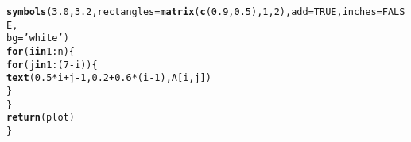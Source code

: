\documentclass[12pt]{article}\usepackage[]{graphicx}\usepackage[]{color}
\makeatletter
\newcommand{\hlnum}[1]{\textcolor[rgb]{0.686,0.059,0.569}{#1}}%
\newcommand{\hlstr}[1]{\textcolor[rgb]{0.192,0.494,0.8}{#1}}%
\newcommand{\hlopt}[1]{\textcolor[rgb]{0,0,0}{#1}}%
\newcommand{\hlstd}[1]{\textcolor[rgb]{0.345,0.345,0.345}{#1}}%
\newcommand{\hlkwa}[1]{\textcolor[rgb]{0.161,0.373,0.58}{\textbf{#1}}}%
\newcommand{\hlkwc}[1]{\textcolor[rgb]{0.333,0.667,0.333}{#1}}%
\newcommand{\hlkwd}[1]{\textcolor[rgb]{0.737,0.353,0.396}{\textbf{#1}}}%
\newenvironment{kframe}{%
 \def\at@end@of@kframe{}%
 \ifinner\ifhmode%
  \def\at@end@of@kframe{\end{minipage}}%
  \begin{minipage}{\columnwidth}%
 \fi\fi%
 \def\FrameCommand##1{\hskip\@totalleftmargin \hskip-\fboxsep
 \colorbox{shadecolor}{##1}\hskip-\fboxsep
     \hskip-\linewidth \hskip-\@totalleftmargin \hskip\columnwidth}%
 \MakeFramed {\advance\hsize-\width
   \@totalleftmargin\z@ \linewidth\hsize
   \@setminipage}}%
 {\par\unskip\endMakeFramed%
 \at@end@of@kframe}
\newenvironment{knitrout}{}{} %
\makeatother
\begin{document}
\begin{knitrout}
\begin{kframe}
\begin{alltt}
  \hlkwd{symbols}\hlstd{(}\hlnum{3.0}\hlstd{,} \hlnum{3.2}\hlstd{,} \hlkwc{rectangles} \hlstd{=} \hlkwd{matrix}\hlstd{(}\hlkwd{c}\hlstd{(}\hlnum{0.9}\hlstd{,} \hlnum{0.5}\hlstd{),} \hlnum{1}\hlstd{,} \hlnum{2}\hlstd{),} \hlkwc{add} \hlstd{=} \hlnum{TRUE}\hlstd{,} \hlkwc{inches} \hlstd{=} \hlnum{FALSE}\hlstd{,}
          \hlkwc{bg} \hlstd{=} \hlstr{'white'}\hlstd{)}
  \hlkwa{for} \hlstd{(i} \hlkwa{in} \hlnum{1}\hlopt{:}\hlstd{n)\{}
    \hlkwa{for} \hlstd{(j} \hlkwa{in} \hlnum{1}\hlopt{:}\hlstd{(}\hlnum{7}\hlopt{-}\hlstd{i))\{}
      \hlkwd{text}\hlstd{(}\hlnum{0.5}\hlopt{*}\hlstd{i}\hlopt{+}\hlstd{j}\hlopt{-}\hlnum{1}\hlstd{,} \hlnum{0.2}\hlopt{+}\hlnum{0.6}\hlopt{*}\hlstd{(i}\hlopt{-}\hlnum{1}\hlstd{), A[i, j])}
    \hlstd{\}}
  \hlstd{\}}
  \hlkwd{return}\hlstd{(plot)}
\hlstd{\}}
\end{alltt}
\end{kframe}
\end{knitrout}
\end{document}
